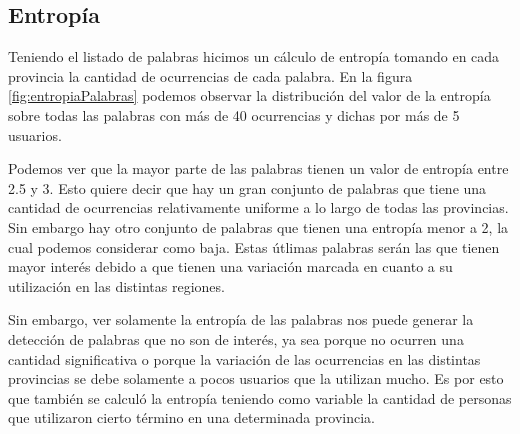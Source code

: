 







\subsection{Entropía}
Teniendo el listado de palabras hicimos un cálculo de entropía tomando en cada provincia la cantidad de ocurrencias de cada palabra. En la figura \ref{fig:entropiaPalabras} podemos observar la distribución del valor de la entropía sobre todas las palabras con más de 40 ocurrencias y dichas por más de 5 usuarios.

Podemos ver que la mayor parte de las palabras tienen un valor de entropía entre 2.5 y 3. Esto quiere decir que hay un gran conjunto de palabras que tiene una cantidad de ocurrencias relativamente uniforme a lo largo de todas las provincias. Sin embargo hay otro conjunto de palabras que tienen una entropía menor a 2, la cual podemos considerar como baja. Estas útlimas palabras serán las que tienen mayor interés debido a que tienen una variación marcada en cuanto a su utilización en las distintas regiones.

Sin embargo, ver solamente la entropía de las palabras nos puede generar la detección de palabras que no son de interés, ya sea porque no ocurren una cantidad significativa o porque la variación de las ocurrencias en las distintas provincias se debe solamente a pocos usuarios que la utilizan mucho. Es por esto que también se calculó la entropía teniendo como variable la cantidad de personas que utilizaron cierto término en una determinada provincia.



